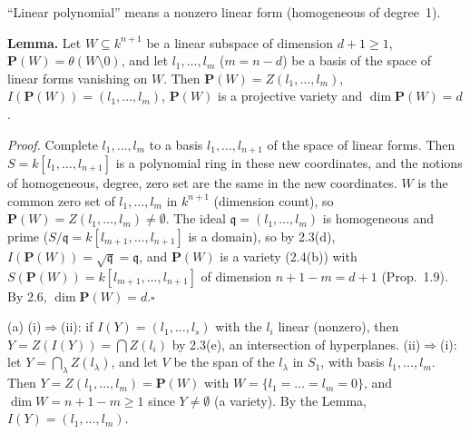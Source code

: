 \documentclass[11pt]{article}
\begin{document}
\pf
``Linear polynomial'' means a nonzero linear form (homogeneous of degree~1).

\textbf{Lemma.} Let $W\subseteq k^{n+1}$ be a linear subspace of dimension $d+1\ge1$, $\mathbf P(W)=\theta(W\setminus0)$, and let $l_1,\dots,l_{m}$ ($m=n-d$) be a basis of the space of linear forms vanishing on $W$. Then $\mathbf P(W)=Z(l_1,\dots,l_m)$, $I(\mathbf P(W))=(l_1,\dots,l_m)$, $\mathbf P(W)$ is a projective variety and $\dim\mathbf P(W)=d$.

\emph{Proof.} Complete $l_1,\dots,l_m$ to a basis $l_1,\dots,l_{n+1}$ of the space of linear forms. Then $S=k[l_1,\dots,l_{n+1}]$ is a polynomial ring in these new coordinates, and the notions of homogeneous, degree, zero set are the same in the new coordinates. $W$ is the common zero set of $l_1,\dots,l_m$ in $k^{n+1}$ (dimension count), so $\mathbf P(W)=Z(l_1,\dots,l_m)\ne\emptyset$. The ideal $\mathfrak q=(l_1,\dots,l_m)$ is homogeneous and prime ($S/\mathfrak q=k[l_{m+1},\dots,l_{n+1}]$ is a domain), so by 2.3(d), $I(\mathbf P(W))=\sqrt{\mathfrak q}=\mathfrak q$, and $\mathbf P(W)$ is a variety (2.4(b)) with $S(\mathbf P(W))=k[l_{m+1},\dots,l_{n+1}]$ of dimension $n+1-m=d+1$ (Prop.~1.9). By 2.6, $\dim\mathbf P(W)=d$.\hfill$\square$

(a) (i)$\Rightarrow$(ii): if $I(Y)=(l_1,\dots,l_s)$ with the $l_i$ linear (nonzero), then $Y=Z(I(Y))=\bigcap Z(l_i)$ by 2.3(e), an intersection of hyperplanes. (ii)$\Rightarrow$(i): let $Y=\bigcap_{\lambda}Z(l_\lambda)$, and let $V$ be the span of the $l_\lambda$ in $S_1$, with basis $l_1,\dots,l_m$. Then $Y=Z(l_1,\dots,l_m)=\mathbf P(W)$ with $W=\{l_1=\dots=l_m=0\}$, and $\dim W=n+1-m\ge1$ since $Y\ne\emptyset$ (a variety). By the Lemma, $I(Y)=(l_1,\dots,l_m)$.
\end{document}
